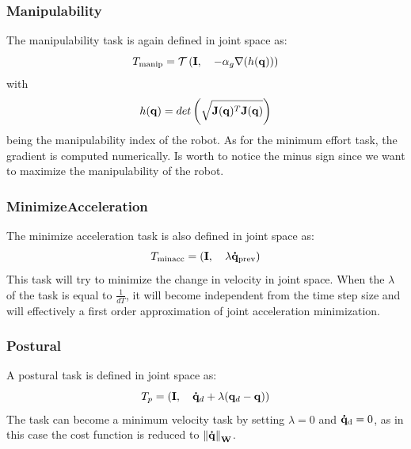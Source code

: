 \subsubsection{Manipulability}
The manipulability task is again defined in joint space as:
\begin{equation}
T_\text{manip} = \mathcal{T} \left(\mathbf{I}, \quad -\alpha_g\nabla(h(\mathbf{q}))\right)
\end{equation}
with
\begin{equation}
h(\mathbf{q}) = det\left(\sqrt{\mathbf{J}(\mathbf{q})^T\mathbf{J}(\mathbf{q})}\right)
\end{equation}
being the manipulability index of the robot. As for the minimum effort task, the gradient is computed numerically. Is worth to notice the minus sign since we want to maximize the manipulability of the robot.

\subsubsection{MinimizeAcceleration}
The minimize acceleration task is also defined in joint space as:
\begin{equation}
T_\text{minacc} = \left(\mathbf{I}, \quad \lambda\mathbf{\dot{q}}_\text{prev}\right)
\end{equation}
This task will try to minimize the change in velocity in joint space. When the $\lambda$ of the task is equal to $\frac{1}{dT}$, it will become independent from the time step size and will effectively a first order approximation of joint acceleration minimization.

\subsubsection{Postural}
A postural task is defined in joint space as:
\begin{equation}
T_p = \left(\mathbf{I}, \quad  \mathbf{\dot{q}}_d + \lambda(\mathbf{q}_d - \mathbf{q})\right)
\label{sec:postural_task}
\end{equation}
The task can become a minimum velocity task by setting $\lambda=0$ and $\mathbf{\dot{q}}_\text{d} = 0$, as in this case the cost function is reduced to $\left \| \mathbf{\dot{q}} \right \|_\textbf{W}$.


